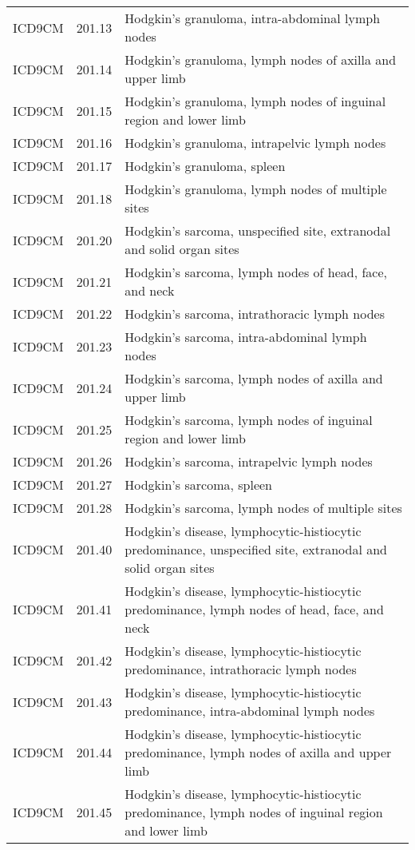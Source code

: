 \begin{longtable}{p{}p{}p{}}
  ICD9CM & 201.13 & Hodgkin's granuloma, intra-abdominal lymph nodes \\ 
  ICD9CM & 201.14 & Hodgkin's granuloma, lymph nodes of axilla and upper limb \\ 
  ICD9CM & 201.15 & Hodgkin's granuloma, lymph nodes of inguinal region and lower limb \\ 
  ICD9CM & 201.16 & Hodgkin's granuloma, intrapelvic lymph nodes \\ 
  ICD9CM & 201.17 & Hodgkin's granuloma, spleen \\ 
  ICD9CM & 201.18 & Hodgkin's granuloma, lymph nodes of multiple sites \\ 
  ICD9CM & 201.20 & Hodgkin's sarcoma, unspecified site, extranodal and solid organ sites \\ 
  ICD9CM & 201.21 & Hodgkin's sarcoma, lymph nodes of head, face, and neck \\ 
  ICD9CM & 201.22 & Hodgkin's sarcoma, intrathoracic lymph nodes \\ 
  ICD9CM & 201.23 & Hodgkin's sarcoma, intra-abdominal lymph nodes \\ 
  ICD9CM & 201.24 & Hodgkin's sarcoma, lymph nodes of axilla and upper limb \\ 
  ICD9CM & 201.25 & Hodgkin's sarcoma, lymph nodes of inguinal region and lower limb \\ 
  ICD9CM & 201.26 & Hodgkin's sarcoma, intrapelvic lymph nodes \\ 
  ICD9CM & 201.27 & Hodgkin's sarcoma, spleen \\ 
  ICD9CM & 201.28 & Hodgkin's sarcoma, lymph nodes of multiple sites \\ 
  ICD9CM & 201.40 & Hodgkin's disease, lymphocytic-histiocytic predominance, unspecified site, extranodal and solid organ sites \\ 
  ICD9CM & 201.41 & Hodgkin's disease, lymphocytic-histiocytic predominance, lymph nodes of head, face, and neck \\ 
  ICD9CM & 201.42 & Hodgkin's disease, lymphocytic-histiocytic predominance, intrathoracic lymph nodes \\ 
  ICD9CM & 201.43 & Hodgkin's disease, lymphocytic-histiocytic predominance, intra-abdominal lymph nodes \\ 
  ICD9CM & 201.44 & Hodgkin's disease, lymphocytic-histiocytic predominance, lymph nodes of axilla and upper limb \\ 
  ICD9CM & 201.45 & Hodgkin's disease, lymphocytic-histiocytic predominance, lymph nodes of inguinal region and lower limb \\ 

\end{longtable}

